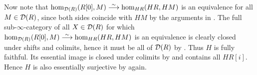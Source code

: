 \begin{proof*}
	Now note that $\hom_{\Dd(R)}(R[0],M)\isomorphism \hom_{HR}(HR,HM)$ is an equivalence for all $M\in \mathcal{D}(R)$, since both sides coincide with $HM$ by the arguments in . The full sub-$\infty$-category of all $X\in \mathcal{D}(R)$ for which $\hom_{\Dd(R)}(R[0],M)\isomorphism \hom_{HR}(HR,HM)$ is an equivalence is clearly closed under shifts and colimits, hence it must be all of $\mathcal{D}(R)$ by . Thus $H$ is fully faithful. Its essential image is closed under colimits by  and contains all $HR[i]$. Hence $H$ is also essentially surjective by  again.	

\end{proof*}
